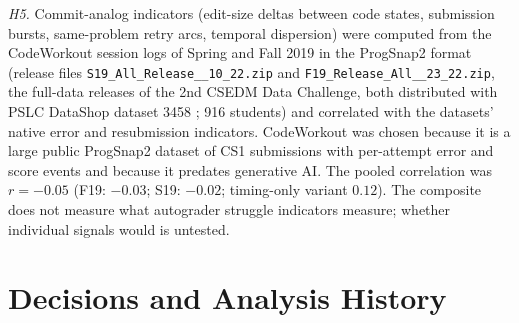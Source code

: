 \documentclass[acmsmall,screen,review,anonymous]{acmart}
\begin{document}
\textit{H5.} Commit-analog indicators (edit-size deltas between code states, submission bursts, same-problem retry arcs, temporal dispersion) were computed from the CodeWorkout session logs of Spring and Fall 2019 in the ProgSnap2 format (release files \texttt{S19\_\allowbreak All\_\allowbreak Release\_\_10\_22.zip} and \texttt{F19\_\allowbreak Release\_\allowbreak All\_\_23\_22.zip}, the full-data releases of the 2nd CSEDM Data Challenge, both distributed with PSLC DataShop dataset 3458 \citep{codeworkout2020dataset}; 916 students) and correlated with the datasets' native error and resubmission indicators. CodeWorkout was chosen because it is a large public ProgSnap2 dataset of CS1 submissions with per-attempt error and score events and because it predates generative AI. The pooled correlation was $r = -0.05$ (F19: $-0.03$; S19: $-0.02$; timing-only variant $0.12$). The composite does not measure what autograder struggle indicators measure; whether individual signals would is untested.

\FloatBarrier
\section{Decisions and Analysis History}
\label{app:history}
\label{app:decisions}
\end{document}
